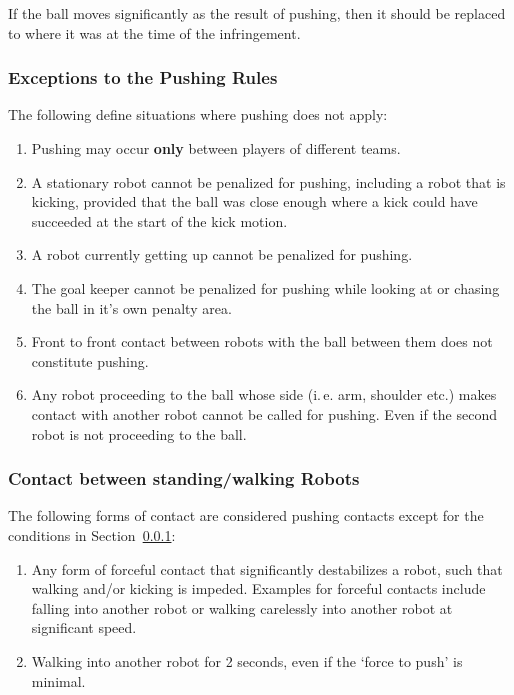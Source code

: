 \documentclass[12pt]{article}
\newcommand{\ie}{\mbox{i.\,e.}\xspace}
\begin{document}
If the ball moves significantly as the result of pushing, then it should be replaced to where it was at the time of the infringement.

\subsubsection{Exceptions to the Pushing Rules}
\label{sec:situations_no_pushing}

The following define situations where pushing does not apply:

\begin{enumerate}
	\item Pushing may occur \textbf{only} between players of different teams.
	\item A stationary robot cannot be penalized for pushing, including a robot that is kicking, provided that the ball was close enough where a kick could have succeeded at the start of the kick motion.
	\item A robot currently getting up cannot be penalized for pushing.
	\item The goal keeper cannot be penalized for pushing while looking at or chasing the ball in it's own penalty area.
	\item Front to front contact between robots with the ball between them does not constitute pushing.
	\item Any robot proceeding to the ball whose side (\ie arm, shoulder etc.) makes contact with another robot cannot be called for pushing. Even if the second robot is not proceeding to the ball.
\end{enumerate}

\subsubsection{Contact between standing/walking Robots}
\label{sec:pushing_contact}

The following forms of contact are considered pushing contacts except for the conditions in Section~\ref{sec:situations_no_pushing}:
\begin{enumerate}
	\item Any form of forceful contact that significantly destabilizes a robot, such that walking and/or kicking is impeded. Examples for forceful contacts include falling into another robot or walking carelessly into another robot at significant speed.
	\item Walking into another robot for 2 seconds, even if the `force to push' is minimal.
\end{enumerate}
\end{document}
